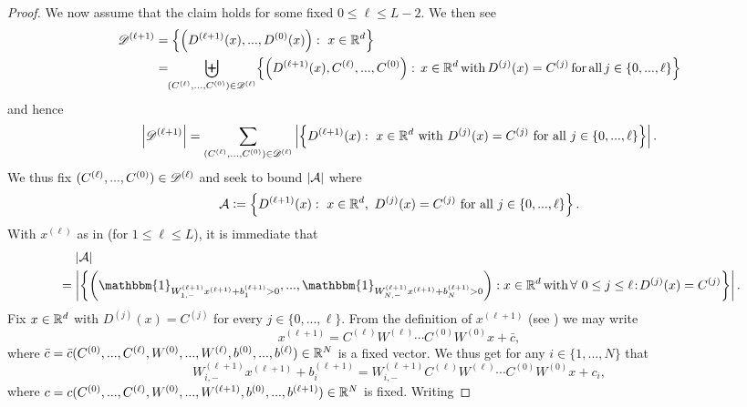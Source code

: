 \begin{proof}
We now assume that the claim holds for some fixed $0 \leq \ell \leq L-2$. We then see 
\begin{align*}
\D^{(\ell + 1)} &= \left\{ \left(D^{(\ell+1)}(x), ..., D^{(0)}(x)\right): \ x \in \RR^d\right\} \\
&= \! \!\biguplus_{(C^{(\ell)}, ..., C^{(0)}) \in \D^{(\ell)}} \! \left\{ \left(D^{(\ell + 1)}(x), C^{(\ell)}, ..., C^{(0)}\right): \! \ x \in \RR^d \!\text{ with } \! D^{(j)}(x)=C^{(j)} \ \!\text{for } \! \text{all } \! j\in \{0,...,\ell\}\right\}
\end{align*}
and hence
\begin{equation} \label{eq:D_bound}
\left\lvert\mathscr{D}^{(\ell + 1)}\right\rvert = \sum_{(C^{(\ell)}, ..., C^{(0)}) \in \mathscr{D}^{(\ell)}} \left\lvert\left\{ D^{(\ell + 1)}(x): \ x \in \mathbb{R}^d \text{ with } D^{(j)}(x)=C^{(j)} \ \text{for all } j\in \{0,...,\ell\}\right\}\right\rvert.
\end{equation}
We thus fix $(C^{(\ell)}, ..., C^{(0)}) \in \mathscr{D}^{(\ell)}$ and seek to bound $\left\lvert\mathcal{A}\right\rvert$ where
\begin{equation*}
\mathcal{A} \mathrel{\mathop:}= \left\{ D^{(\ell + 1)}(x): \ x \in \mathbb{R}^d, \  D^{(j)}(x) = C^{(j)} \ \text{for all } j\in \{0,...,\ell\}\right\}.
\end{equation*}
With $x^{(\ell)}$ as in  (for $1 \leq \ell \leq L$), it is immediate that
\begin{align*}
&\norel\abs{\mathcal{A}} \\
&= \abs{\left\{\left(\mathbbm{1}_{W^{(\ell + 1)}_{1,-}x^{(\ell+1)} + b^{(\ell + 1)}_1 > 0}, ..., \mathbbm{1}_{W^{(\ell + 1)}_{N,-}x^{(\ell+1)} + b^{(\ell + 1)}_N > 0}\right):  x \in \RR^d \!\text{ with }  \! \forall \  0\leq j \leq \ell\!:\!D^{(j)}(x)=C^{(j)}\right\}}.
\end{align*}
Fix $x \in \mathbb{R}^d$ with $D^{(j)}(x)=C^{(j)}$ for every $j \in \{0,..., \ell\}$. From the definition of $x^{(\ell+1)}$ (see ) we may write
\begin{equation*}
x^{(\ell+1)} = C^{(\ell)}W^{(\ell)} \cdots C^{(0)}W^{(0)}x + \bar{c},
\end{equation*} 
where $\bar{c} = \bar{c}(C^{(0)}, ..., C^{(\ell)}, W^{(0)}, ..., W^{(\ell)}, b^{(0)}, ..., b^{(\ell)})\in \mathbb{R}^N$ is a fixed vector. We thus get for any $i \in \{1,...,N\}$ that
\begin{equation*}
W^{(\ell + 1)}_{i,-}x^{(\ell+1)} + b^{(\ell+1)}_i = W^{(\ell + 1)}_{i,-}C^{(\ell)}W^{(\ell)} \cdots C^{(0)}W^{(0)}x + c_i,
\end{equation*}
where $c = c(C^{(0)}, ..., C^{(\ell)}, W^{(0)}, ..., W^{(\ell+1)}, b^{(0)}, ..., b^{(\ell+1)}) \in \mathbb{R}^N$ is fixed. Writing 

\end{proof}
